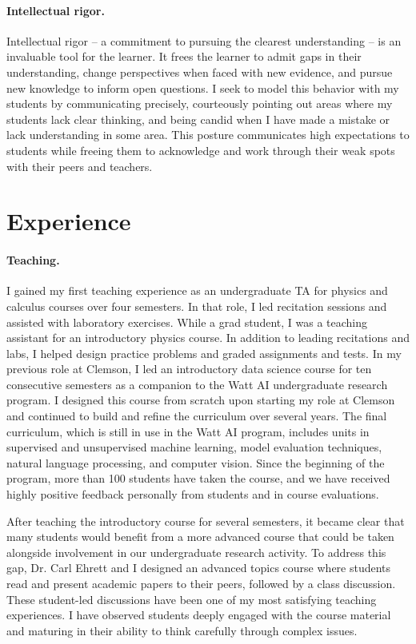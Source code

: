 \documentclass[nobib]{tufte-handout}
\begin{document}
\paragraph{Intellectual rigor.} Intellectual rigor – a commitment to pursuing the clearest understanding – is an invaluable tool for the learner. It frees the learner to admit gaps in their understanding, change perspectives when faced with new evidence, and pursue new knowledge to inform open questions. I seek to model this behavior with my students by communicating precisely, courteously pointing out areas where my students lack clear thinking, and being candid when I have made a mistake or lack understanding in some area. This posture communicates high expectations to students while freeing them to acknowledge and work through their weak spots with their peers and teachers.

\section{Experience}

\paragraph{Teaching.} I gained my first teaching experience as an undergraduate TA for physics and calculus courses over four semesters. In that role, I led recitation sessions and assisted with laboratory exercises. While a grad student, I was a teaching assistant for an introductory physics course. In addition to leading recitations and labs, I helped design practice problems and graded assignments and tests. In my previous role at Clemson, I led an introductory data science course for ten consecutive semesters as a companion to the Watt AI undergraduate research program. I designed this course from scratch upon starting my role at Clemson and continued to build and refine the curriculum over several years. The final curriculum, which is still in use in the Watt AI program, includes units in supervised and unsupervised machine learning, model evaluation techniques, natural language processing, and computer vision. Since the beginning of the program, more than 100 students have taken the course, and we have received highly positive feedback personally from students and in course evaluations.

After teaching the introductory course for several semesters, it became clear that many students would benefit from a more advanced course that could be taken alongside involvement in our undergraduate research activity. To address this gap, Dr. Carl Ehrett and I designed an advanced topics course where students read and present academic papers to their peers, followed by a class discussion. These student-led discussions have been one of my most satisfying teaching experiences. I have observed students deeply engaged with the course material and maturing in their ability to think carefully through complex issues.
\end{document}
